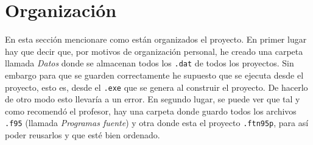 \documentclass[11pt]{article}
\begin{document}
\section{Organización}

En esta sección mencionare como están organizados el proyecto. En primer lugar hay que decir que, por motivos de organización personal, he creado una carpeta llamada \textit{Datos} donde se almacenan todos los \texttt{.dat} de todos los proyectos. Sin embargo para que se guarden correctamente he supuesto que se ejecuta desde el proyecto, esto es, desde el \texttt{.exe} que se genera al construir el proyecto. De hacerlo de otro modo esto llevaría a un error. En segundo lugar, se puede ver que tal y como recomendó el profesor, hay una carpeta donde guardo todos los archivos \texttt{.f95} (llamada \textit{Programas fuente}) y otra donde esta el proyecto \texttt{.ftn95p}, para así poder reusarlos y que esté bien ordenado. 



\end{document}
